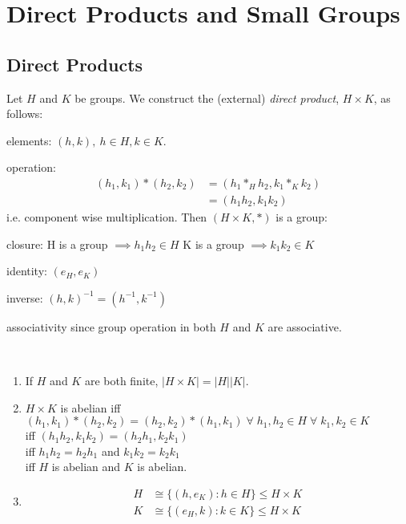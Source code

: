 \section{Direct Products and Small Groups}

\subsection{Direct Products}

Let $H$ and $K$ be groups.
We construct the (external) \emph{direct product}, $H \times K$, as follows:

elements: $(h, k),\ h \in H, k \in K$.

operation: \begin{align*}
  (h_1, k_1) * (h_2, k_2) &= (h_1 *_H h_2, k_1 *_K k_2) \\
  &= (h_1 h_2, k_1 k_2)
\end{align*} 
i.e. component wise multiplication.
Then $(H \times K, *)$ is a group:

closure: 
H is a group $\implies h_1 h_2 \in H$ 
K is a group $\implies k_1 k_2 \in K$

identity: $(e_H, e_K)$

inverse: $(h, k)^{-1} = (h^{-1}, k^{-1})$

associativity since group operation in both $H$ and $K$ are associative.

\begin{remark}

  ~

  \begin{enumerate}
    \item If $H$ and $K$ are both finite, $| H \times K| = |H| |K|$.
    \item $H \times K$ is abelian iff $(h_1, k_1) * (h_2, k_2) = (h_2, k_2) * (h_1, k_1) \; \forall \; h_1, h_2 \in H \; \forall \; k_1, k_2 \in K$ \\
    iff $(h_1 h_2, k_1 k_2) = (h_2 h_1, k_2 k_1)$ \\
    iff $h_1 h_2 = h_2 h_1$ and $k_1 k_2 = k_2 k_1$ \\
    iff $H$ is abelian and $K$ is abelian.
    \item 
    \begin{align*}
      H &\cong \{ (h, e_K) : h \in H \} \leq H \times K \\
      K &\cong \{ (e_H, k) : k \in K \} \leq H \times K
    \end{align*}
  \end{enumerate}
\end{remark} 

